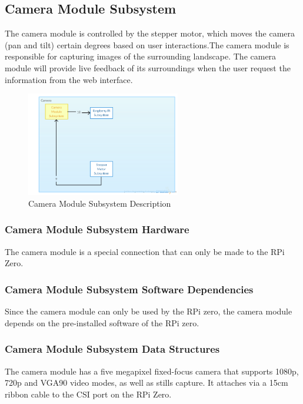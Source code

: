\subsection{Camera Module Subsystem}
The camera module is controlled by the stepper motor, which moves the camera (pan and tilt) certain degrees based on user interactions.The camera module is responsible for capturing images of the surrounding landscape. The camera module will provide live feedback of its surroundings when the user request the information from the web interface.

\begin{figure}[h!] 
 	\centering 
  	\includegraphics[width=0.60\textwidth]{architectural design specification latex/images/ADSdiagrams/cameramodulesubsystem.png} 
 \caption{Camera Module Subsystem Description} 
\end{figure}

\subsubsection{Camera Module Subsystem Hardware}
The camera module is a special connection that can only be made to the RPi Zero.


\subsubsection{Camera Module Subsystem Software Dependencies}
Since the camera module can only be used by the RPi zero, the camera module depends on the pre-installed software of the RPi zero.


\subsubsection{Camera Module Subsystem Data Structures}
The camera module has a five megapixel fixed-focus camera that supports 1080p, 720p and VGA90 video modes, as well as stills capture. It attaches via a 15cm ribbon cable to the CSI port on the RPi Zero.
